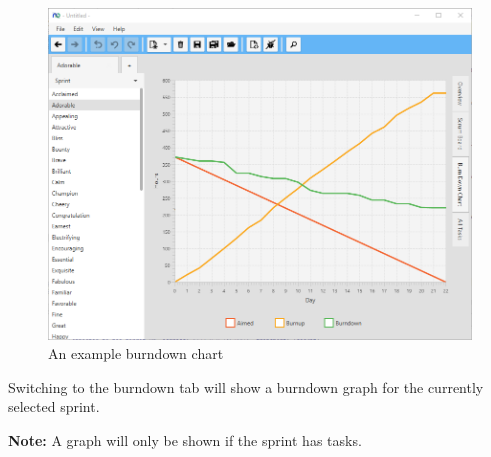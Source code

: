 \begin{figure}[H]
\centering
\includegraphics[width=\textwidth]{images/screenshots/burndown.png}
\caption{An example burndown chart}
\label{fig:burndown}
\end{figure}

Switching to the burndown tab will show a burndown graph for the currently selected sprint.

\textbf{Note:}\newline
A graph will only be shown if the sprint has tasks.